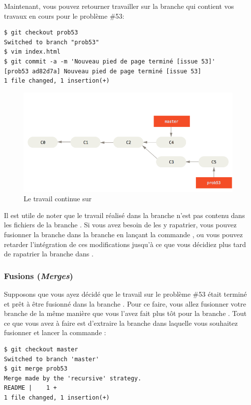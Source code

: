 Maintenant, vous pouvez retourner travailler sur la branche qui contient vos travaux en cours pour le problème \#53:
\begin{Schunk}
\begin{Verbatim}
$ git checkout prob53
Switched to branch "prob53"
$ vim index.html
$ git commit -a -m 'Nouveau pied de page terminé [issue 53]'
[prob53 ad82d7a] Nouveau pied de page terminé [issue 53]
1 file changed, 1 insertion(+)
\end{Verbatim}
\end{Schunk}

\begin{figure}[!h]
  \centering
  \includegraphics{images/basic-branching-6}
  \caption{Le travail continue sur }
  \label{fig:git:basic-branching-6}
\end{figure}

Il est utile de noter que le travail réalisé dans la branche  n'est pas contenu dans les fichiers de la branche .
Si vous avez besoin de les y rapatrier, vous pouvez fusionner la branche  dans la branche  en lançant la commande , ou vous pouvez retarder l'intégration de ces modifications jusqu'à ce que vous décidiez plus tard de rapatrier la branche  dans .


\subsubsection{Fusions (\emph{Merges})}
\label{sec:git:basic_merging}

Supposons que vous ayez décidé que le travail sur le problème \#53 était terminé et prêt à être fusionné dans la branche .
Pour ce faire, vous allez fusionner votre branche  de la même manière que vous l'avez fait plus tôt pour la branche .
Tout ce que vous avez à faire est d'extraire la branche dans laquelle vous souhaitez fusionner et lancer la commande :
\begin{Schunk}
\begin{Verbatim}
$ git checkout master
Switched to branch 'master'
$ git merge prob53
Merge made by the 'recursive' strategy.
README |    1 +
1 file changed, 1 insertion(+)
\end{Verbatim}
\end{Schunk}

